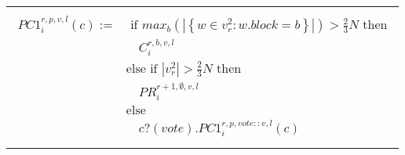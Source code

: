 \documentclass[12pt]{report}
\renewcommand{\|}{\;|\;}
\begin{document}
\begin{center}
\begin{tabular}{l }
		\hline \\
		{$\!\begin{aligned}
		PC1_i^{r,p,v,l}(c) := 
			& \text{ if } max_{b}(|\left\{ w \in v_r^2 : w.block = b\right\}|) > \frac{2}{3} N \text{ then} \\
				& \quad C_i^{r,b,v,l} \\
			& \text{else if }  | v_r^2 | > \frac{2}{3} N \text{ then} \\ 
				& \quad PR_i^{r+1,\emptyset,v,l} \\ 
			& \text{else} \\
				& \quad c?(vote) . PC1_i^{r,p,vote::v,l}(c) \\
		\end{aligned}$}


	\end{tabular}
\end{center}
\end{document}
